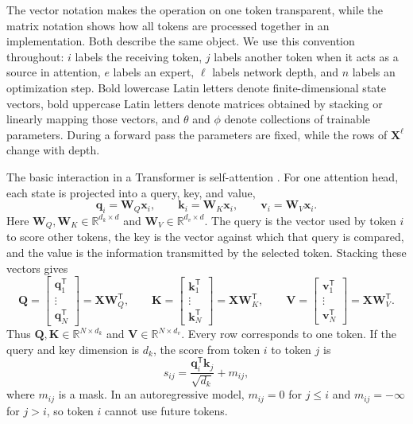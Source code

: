 \documentclass[11pt]{article}
\begin{document}
The vector notation makes the operation on one token transparent, while the matrix notation shows how all tokens are processed together in an implementation. Both describe the same object. We use this convention throughout: $i$ labels the receiving token, $j$ labels another token when it acts as a source in attention, $e$ labels an expert, $\ell$ labels network depth, and $n$ labels an optimization step. Bold lowercase Latin letters denote finite-dimensional state vectors, bold uppercase Latin letters denote matrices obtained by stacking or linearly mapping those vectors, and $\theta$ and $\phi$ denote collections of trainable parameters. During a forward pass the parameters are fixed, while the rows of $\mathbf X^\ell$ change with depth.

The basic interaction in a Transformer is self-attention \cite{vaswani2017}. For one attention head, each state is projected into a query, key, and value,
\begin{equation}
\mathbf q_i
=
\mathbf W_Q\mathbf x_i,
\qquad
\mathbf k_i
=
\mathbf W_K\mathbf x_i,
\qquad
\mathbf v_i
=
\mathbf W_V\mathbf x_i.
\label{eq:qkv}
\end{equation}
Here $\mathbf W_Q,\mathbf W_K\in\mathbb R^{d_k\times d}$ and $\mathbf W_V\in\mathbb R^{d_v\times d}$. The query is the vector used by token $i$ to score other tokens, the key is the vector against which that query is compared, and the value is the information transmitted by the selected token. Stacking these vectors gives
\begin{equation}
\mathbf Q
=
\begin{bmatrix}
\mathbf q_1^{\mathsf T}\\
\vdots\\
\mathbf q_N^{\mathsf T}
\end{bmatrix}
=
\mathbf X\mathbf W_Q^{\mathsf T},
\qquad
\mathbf K
=
\begin{bmatrix}
\mathbf k_1^{\mathsf T}\\
\vdots\\
\mathbf k_N^{\mathsf T}
\end{bmatrix}
=
\mathbf X\mathbf W_K^{\mathsf T},
\qquad
\mathbf V
=
\begin{bmatrix}
\mathbf v_1^{\mathsf T}\\
\vdots\\
\mathbf v_N^{\mathsf T}
\end{bmatrix}
=
\mathbf X\mathbf W_V^{\mathsf T}.
\label{eq:qkv-matrices}
\end{equation}
Thus $\mathbf Q,\mathbf K\in\mathbb R^{N\times d_k}$ and $\mathbf V\in\mathbb R^{N\times d_v}$. Every row corresponds to one token. If the query and key dimension is $d_k$, the score from token $i$ to token $j$ is
\begin{equation}
s_{ij}
=
\frac{\mathbf q_i^{\mathsf T}\mathbf k_j}{\sqrt{d_k}}
+
m_{ij},
\label{eq:score}
\end{equation}
where $m_{ij}$ is a mask. In an autoregressive model, $m_{ij}=0$ for $j\leq i$ and $m_{ij}=-\infty$ for $j>i$, so token $i$ cannot use future tokens.
\end{document}
